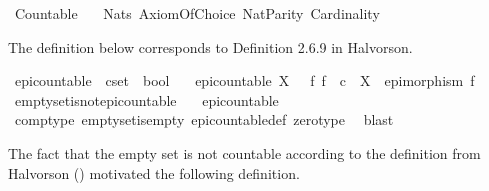 %
\begin{isabellebody}%
%
%
\isadelimtheory
%
\endisadelimtheory
%
\isatagtheory
{}\isamarkupfalse%
\ Countable\isanewline
\ \ \ Nats\ Axiom{\isacharunderscore}{\kern0pt}Of{\isacharunderscore}{\kern0pt}Choice\ Nat{\isacharunderscore}{\kern0pt}Parity\ Cardinality\isanewline
{}%
\endisatagtheory
{\isafoldtheory}%
%
\isadelimtheory
%
\endisadelimtheory
%
\begin{isamarkuptext}%
The definition below corresponds to Definition 2.6.9 in Halvorson.%
\end{isamarkuptext}\isamarkuptrue%
\isamarkupfalse%
\ epi{\isacharunderscore}{\kern0pt}countable\ {\isacharcolon}{\kern0pt}{\isacharcolon}{\kern0pt}\ {\isachardoublequoteopen}cset\ {\isasymRightarrow}\ bool{\isachardoublequoteclose}\ \isanewline
\ \ {\isachardoublequoteopen}epi{\isacharunderscore}{\kern0pt}countable\ X\ {\isasymlongleftrightarrow}\ {\isacharparenleft}{\kern0pt}{\isasymexists}\ f{\isachardot}{\kern0pt}\ f\ {\isacharcolon}{\kern0pt}\ {\isasymnat}\isactrlsub c\ {\isasymrightarrow}\ X\ {\isasymand}\ epimorphism\ f{\isacharparenright}{\kern0pt}{\isachardoublequoteclose}\isanewline
\isanewline
{}\isamarkupfalse%
\ emptyset{\isacharunderscore}{\kern0pt}is{\isacharunderscore}{\kern0pt}not{\isacharunderscore}{\kern0pt}epi{\isacharunderscore}{\kern0pt}countable{\isacharcolon}{\kern0pt}\isanewline
\ \ {\isachardoublequoteopen}{\isasymnot}\ {\isacharparenleft}{\kern0pt}epi{\isacharunderscore}{\kern0pt}countable\ {\isasymemptyset}{\isacharparenright}{\kern0pt}{\isachardoublequoteclose}\isanewline
%
\isadelimproof
\ \ %
\endisadelimproof
%
\isatagproof
{}\isamarkupfalse%
\ comp{\isacharunderscore}{\kern0pt}type\ emptyset{\isacharunderscore}{\kern0pt}is{\isacharunderscore}{\kern0pt}empty\ epi{\isacharunderscore}{\kern0pt}countable{\isacharunderscore}{\kern0pt}def\ zero{\isacharunderscore}{\kern0pt}type\ \isamarkupfalse%
\ blast%
\endisatagproof
{\isafoldproof}%
%
\isadelimproof
%
\endisadelimproof
%
\begin{isamarkuptext}%
The fact that the empty set is not countable according to the definition from Halvorson
  () motivated the following definition.%

\end{isamarkuptext}
\end{isabellebody}
